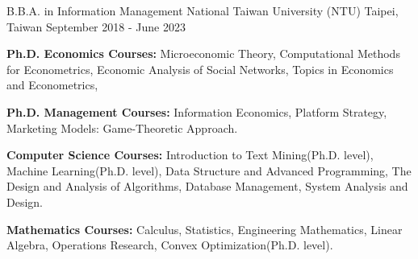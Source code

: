 

\begin{cventries}

  \cventry
  {B.B.A. in Information Management} %
    {National Taiwan University (NTU)} %
    {Taipei, Taiwan} %
    {September 2018 - June 2023} %
    {
      \begin{cvitems} %
        \item   \textbf{Ph.D. Economics Courses:}
                Microeconomic Theory,
                Computational Methods for Econometrics,
                Economic Analysis of Social Networks,
                Topics in Economics and Econometrics,
        \item   \textbf{Ph.D. Management Courses:}
                Information Economics, Platform Strategy,
                Marketing Models: Game-Theoretic Approach.
        \item   \textbf{Computer Science Courses:}
            Introduction to Text Mining(Ph.D. level),
            Machine Learning(Ph.D. level),
                Data Structure and Advanced Programming,
                The Design and Analysis of Algorithms,
                Database Management,
                System Analysis and Design.
        \item   \textbf{Mathematics Courses:}
                Calculus,
                Statistics,
                Engineering Mathematics,
                Linear Algebra,
                Operations Research,
                Convex Optimization(Ph.D. level).
      \end{cvitems}
    }

\end{cventries}
